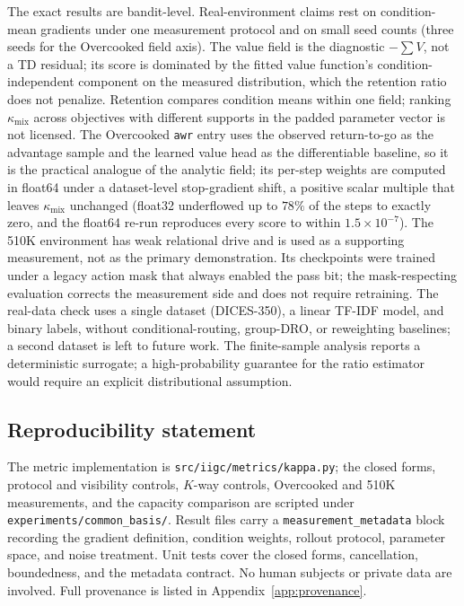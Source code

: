 \documentclass{article}
\newcommand{\kmix}{\kappa_{\mathrm{mix}}}
\begin{document}
The exact results are bandit-level. Real-environment claims rest on
condition-mean gradients under one measurement protocol and on small seed
counts (three seeds for the Overcooked field axis). The value field is the
diagnostic $-\sum V$, not a TD residual; its score is dominated by the fitted
value function's condition-independent component on the measured
distribution, which the retention ratio does not penalize. Retention compares
condition means within one field; ranking $\kmix$ across objectives with
different supports in the padded parameter vector is not licensed. The Overcooked
\texttt{awr} entry uses the observed return-to-go as the advantage sample and
the learned value head as the differentiable baseline, so it is the practical
analogue of the analytic field; its per-step weights are computed in float64
under a dataset-level stop-gradient shift, a positive scalar multiple that
leaves $\kmix$ unchanged (float32 underflowed up to $78\%$ of the steps to
exactly zero, and the float64 re-run reproduces every score to within
$1.5\times10^{-7}$). The 510K environment has
weak relational drive and is used as a supporting measurement, not as the
primary demonstration. Its checkpoints were trained under a legacy action mask
that always enabled the pass bit; the mask-respecting evaluation corrects the
measurement side and does not require retraining. The real-data check uses a
single dataset (DICES-350), a linear TF-IDF model, and binary labels, without
conditional-routing, group-DRO, or reweighting baselines; a second dataset is
left to future work. The finite-sample analysis reports a
deterministic surrogate; a high-probability guarantee for the ratio estimator
would require an explicit distributional assumption.

\subsection*{Reproducibility statement}

The metric implementation is \texttt{src/iigc/metrics/kappa.py}; the closed
forms, protocol and visibility controls, $K$-way controls, Overcooked and 510K
measurements, and the capacity comparison are scripted under
\texttt{experiments/common\_basis/}. Result files carry a
\texttt{measurement\_metadata} block recording the gradient definition,
condition weights, rollout protocol, parameter space, and noise treatment.
Unit tests cover the closed forms, cancellation, boundedness, and the
metadata contract. No human subjects or private data are involved. Full
provenance is listed in Appendix~\ref{app:provenance}.
\end{document}
